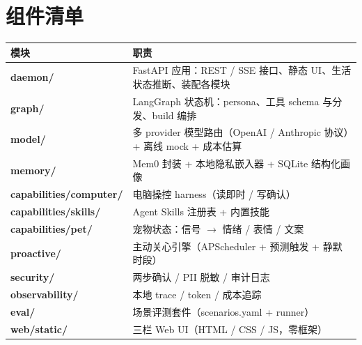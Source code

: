 \section{组件清单}
\begin{center}
\footnotesize
\begin{tabularx}{\linewidth}{>{\bfseries\ttfamily\footnotesize}p{3cm} X}
\toprule
模块 & 职责 \\
\midrule
daemon/ & FastAPI 应用：REST / SSE 接口、静态 UI、生活状态推断、装配各模块 \\
graph/ & LangGraph 状态机：persona、工具 schema 与分发、build 编排 \\
model/ & 多 provider 模型路由（OpenAI / Anthropic 协议）+ 离线 mock + 成本估算 \\
memory/ & Mem0 封装 + 本地隐私嵌入器 + SQLite 结构化画像 \\
capabilities/computer/ & 电脑操控 harness（读即时 / 写确认） \\
capabilities/skills/ & Agent Skills 注册表 + 内置技能 \\
capabilities/pet/ & 宠物状态：信号 $\to$ 情绪 / 表情 / 文案 \\
proactive/ & 主动关心引擎（APScheduler + 预测触发 + 静默时段） \\
security/ & 两步确认 / PII 脱敏 / 审计日志 \\
observability/ & 本地 trace / token / 成本追踪 \\
eval/ & 场景评测套件（scenarios.yaml + runner） \\
web/static/ & 三栏 Web UI（HTML / CSS / JS，零框架） \\
\bottomrule
\end{tabularx}
\end{center}

